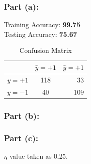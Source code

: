 \documentclass[11pt]{article}
\begin{document}
\begin{flushleft}
\subsubsection*{Part (a):}
Training Accuracy: \textbf{99.75} \\ 
Testing Accuracy:  \textbf{75.67}

\begin{table}[h!]
	\centering
	\caption{Confusion Matrix}
	\begin{tabular}{l|c|r}
		  & $\hat{y} =+1$ & $\hat{y} =+1$\\
		\hline
		$y =+1$ & 118 & 33\\
		$y =-1$ & 40 & 109\\
	\end{tabular}
\end{table}




\subsubsection*{Part (b):}

\begin{figure}[H]
	\centering
\end{figure}

\pagebreak
\subsubsection*{Part (c):}
$\eta$ value taken as 0.25.


\end{flushleft}
\end{document}
